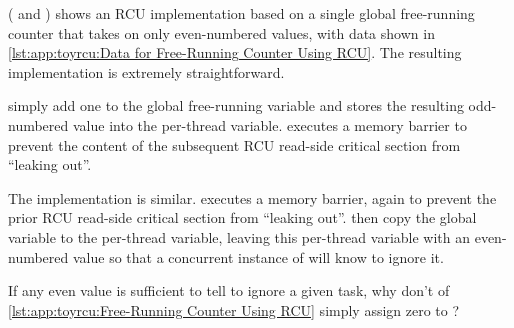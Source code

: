 ( and )
shows an RCU implementation based on a single global free-running counter
that takes on only even-numbered values, with data shown in
\cref{lst:app:toyrcu:Data for Free-Running Counter Using RCU}.
The resulting  implementation is extremely
straightforward.
\begin{lineref}
 simply
add one to the global free-running 
variable and stores the resulting odd-numbered value into the
 per-thread variable.
 executes a memory barrier to prevent the content of the
subsequent RCU read-side critical section from ``leaking out''.
\end{lineref}

\begin{lineref}
The  implementation is similar.
 executes a memory barrier, again to prevent the prior RCU
read-side critical section from ``leaking out''.
 then copy the  global variable to the
 per-thread variable, leaving this per-thread
variable with an even-numbered value so that a concurrent instance
of  will know to ignore it.
\end{lineref}

\QuickQuiz{}
	\begin{lineref}
	If any even value is sufficient to tell 
	to ignore a given task, why don't  of
	\cref{lst:app:toyrcu:Free-Running Counter Using RCU}
	simply assign zero to ?
	\end{lineref}
 \QuickQuizEnd

